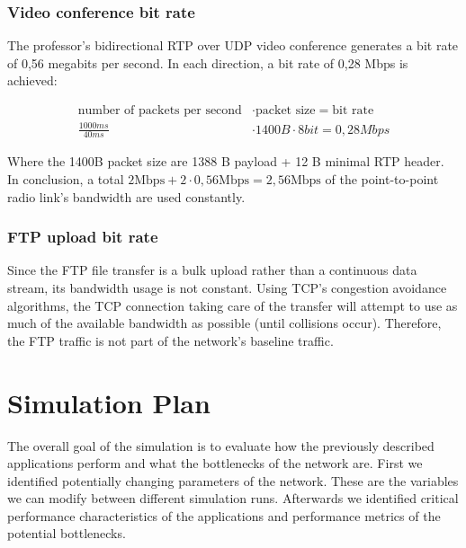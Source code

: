 \documentclass[
10pt, %
a4paper, %
oneside, %
headinclude,footinclude, %
BCOR5mm, %
]{scrartcl}
\begin{document}
\subsubsection{Video conference bit rate}
The professor's bidirectional RTP over UDP video conference generates a bit rate of 0,56 megabits per second. In each direction, a bit rate of 0,28 Mbps is achieved:

\begin{align*}
\text{number of packets per second} &\cdot \text{packet size} = \text{bit rate}\\
\frac{1000ms}{40ms} &\cdot 1400B \cdot 8 bit = 0,28 Mbps
\end{align*}

Where the 1400B packet size are 1388 B payload + 12 B minimal RTP header.\\

In conclusion, a total $2\text{Mbps} + 2 \cdot 0,56 \text{Mbps} = 2,56 \text{Mbps}$ of the point-to-point radio link's bandwidth are used constantly.

\subsubsection{FTP upload bit rate}
Since the FTP file transfer is a bulk upload rather than a continuous data stream, its bandwidth usage is not constant. Using TCP's congestion avoidance algorithms, the TCP connection taking care of the transfer will attempt to use as much of the available bandwidth as possible (until collisions occur). Therefore, the FTP traffic is not part of the network's baseline traffic.


\section{Simulation Plan}
\label{sec:sim_plan}

The overall goal of the simulation is to evaluate how the previously described applications perform and what the bottlenecks of the network are. First we identified potentially changing parameters of the network. These are the variables we can modify between different simulation runs. Afterwards we identified critical performance characteristics of the applications and performance metrics of the potential bottlenecks.
\end{document}
